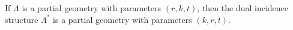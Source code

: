If $\Lambda$ is a partial geometry with parameters $(r, k, t)$, then the dual incidence structure $\Lambda^*$ is a partial geometry with parameters $(k, r, t)$.

